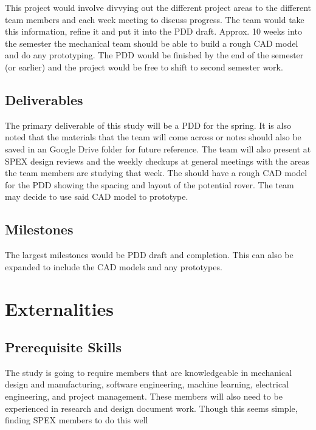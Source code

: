 \documentclass[conference]{IEEEtran} %
\begin{document}
This project would involve divvying out the different project areas to the different team members and each week meeting to discuss progress. 
The team would take this information, refine it and put it into the PDD draft. 
Approx. 10 weeks into the semester the mechanical team should be able to build a rough CAD model and do any prototyping.
The PDD would be finished by the end of the semester (or earlier) and the project would be free to shift to second semester work.    

\subsection{Deliverables}
\label{subsec:deliverables}
The primary deliverable of this study will be a PDD for the spring. It is also noted that the materials that the team will come across or notes should also be saved in an Google Drive folder for future reference.  
The team will also present at SPEX design reviews and the weekly checkups at general meetings with the areas the team members are studying that week.
The should have a rough CAD model for the PDD showing the spacing and layout of the potential rover. 
The team may decide to use said CAD model to prototype. 

\subsection{Milestones}
\label{subsec:milestones}
The largest milestones would be PDD draft and completion. This can also be expanded to include the CAD models and any prototypes. 

\section{Externalities}
\subsection{Prerequisite Skills}
The study is going to require members that are knowledgeable in mechanical design and manufacturing, software engineering, machine learning, electrical engineering, and project management. These members will also need to be experienced in research and design document work. Though this seems simple, finding SPEX members to do this well  
\end{document}
